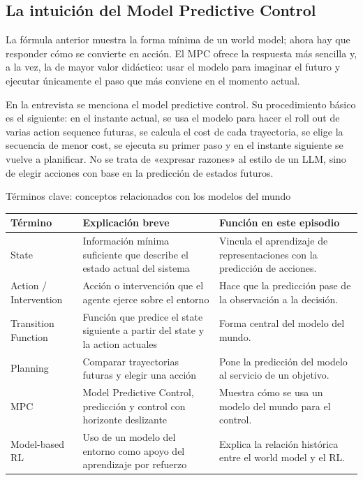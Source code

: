 \documentclass[a4paper]{article}
\begin{document}
\subsection{La intuición del Model Predictive Control}

La fórmula anterior muestra la forma mínima de un world model; ahora hay que responder cómo se convierte en acción. El MPC ofrece la respuesta más sencilla y, a la vez, la de mayor valor didáctico: usar el modelo para imaginar el futuro y ejecutar únicamente el paso que más conviene en el momento actual.

En la entrevista se menciona el model predictive control. Su procedimiento básico es el siguiente: en el instante actual, se usa el modelo para hacer el roll out de varias action sequence futuras, se calcula el cost de cada trayectoria, se elige la secuencia de menor cost, se ejecuta su primer paso y en el instante siguiente se vuelve a planificar. No se trata de «expresar razones» al estilo de un LLM, sino de elegir acciones con base en la predicción de estados futuros.

\begin{knowledgebox}{Términos clave: conceptos relacionados con los modelos del mundo}
\begin{tabularx}{\textwidth}{p{}p{}X}
\toprule
Término & Explicación breve & Función en este episodio \\
\midrule
State & Información mínima suficiente que describe el estado actual del sistema & Vincula el aprendizaje de representaciones con la predicción de acciones. \\
Action / Intervention & Acción o intervención que el agente ejerce sobre el entorno & Hace que la predicción pase de la observación a la decisión. \\
Transition Function & Función que predice el state siguiente a partir del state y la action actuales & Forma central del modelo del mundo. \\
Planning & Comparar trayectorias futuras y elegir una acción & Pone la predicción del modelo al servicio de un objetivo. \\
MPC & Model Predictive Control, predicción y control con horizonte deslizante & Muestra cómo se usa un modelo del mundo para el control. \\
Model-based RL & Uso de un modelo del entorno como apoyo del aprendizaje por refuerzo & Explica la relación histórica entre el world model y el RL. \\
\bottomrule
\end{tabularx}
\end{knowledgebox}
\end{document}
